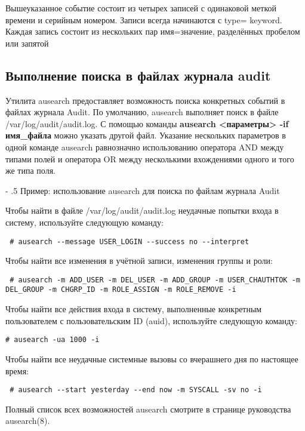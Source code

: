 \documentclass[a4paper,10pt,twoside]{article}
\makeatletter
\renewcommand\paragraph{%
   \@startsection{paragraph}{4}{0mm}%
      {-\baselineskip}%
      {.5\baselineskip}%
      {\normalfont\normalsize\bfseries}}
\makeatother
\begin{document}
Вышеуказанное событие состоит из четырех записей с одинаковой меткой времени и серийным номером. Записи всегда начинаются с type= keyword. Каждая запись состоит из нескольких пар имя=значение, разделённых пробелом или запятой


\subsection{Выполнение поиска в файлах журнала audit}
Утилита ausearch предоставляет возможность поиска конкретных событий в файлах журнала Audit. По умолчанию, ausearch выполняет поиск в файле /var/log/audit/audit.log. С помощью команды \textbf{ausearch <параметры> -if имя\_файла} можно указать другой файл. Указание нескольких параметров в одной команде ausearch равнозначно использованию оператора AND между типами полей и оператора OR между несколькими вхождениями одного и того же типа поля.


\paragraph{Пример: использование ausearch для поиска по файлам журнала Audit}

Чтобы найти в файле /var/log/audit/audit.log неудачные попытки входа в систему, используйте следующую команду:
\begin{verbatim}
 # ausearch --message USER_LOGIN --success no --interpret
\end{verbatim} 

Чтобы найти все изменения в учётной записи, изменения группы и роли: 
\begin{verbatim}
 # ausearch -m ADD_USER -m DEL_USER -m ADD_GROUP -m USER_CHAUTHTOK -m DEL_GROUP -m CHGRP_ID -m ROLE_ASSIGN -m ROLE_REMOVE -i
\end{verbatim} 

Чтобы найти все действия входа в систему, выполненные конкретным пользователем с пользовательским ID (auid), используйте следующую команду:
\begin{verbatim}
# ausearch -ua 1000 -i
\end{verbatim} 

Чтобы найти все неудачные системные вызовы со вчерашнего дня по настоящее время:
\begin{verbatim}
 # ausearch --start yesterday --end now -m SYSCALL -sv no -i
\end{verbatim} 

Полный список всех возможностей ausearch смотрите в странице руководства ausearch(8). 
\end{document}
